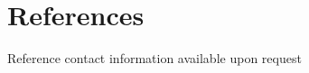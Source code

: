 \documentclass[11pt]{article} %
\begin{document}
\pagebreak[3]
\section{References}
Reference contact information available upon request
\begin{paracol}{2}
    

    
\switchcolumn
    

    

\end{paracol}
\end{document}
